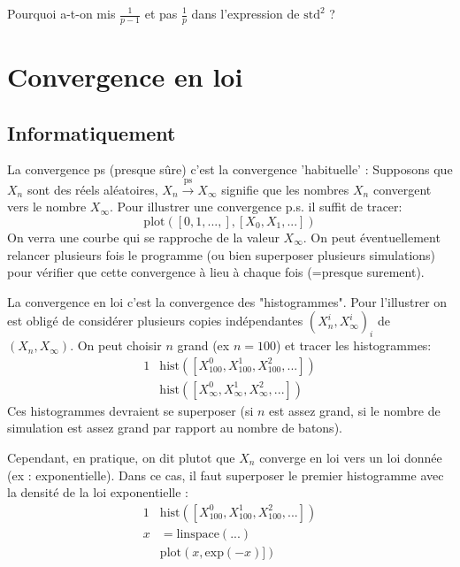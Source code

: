 \documentclass{article}
\def\std{\text{std}}
\begin{document}
\begin{exo} Pourquoi a-t-on mis $\frac 1 {p-1}$ et pas $\frac 1 p $ dans l'expression de $\std^2$ ?    
\end{exo}








 



\section{Convergence en loi}


\subsection{Informatiquement}

La convergence ps (presque sûre) c'est la convergence 'habituelle' :     Supposons que $X_n$ sont des réels aléatoires,   $X_n   \xrightarrow{\text{ps}} X_\infty$ signifie que les nombres $X_n$ convergent vers le nombre $X_\infty$.   Pour illustrer une convergence p.s. il suffit de tracer: 
$$
\mathrm{plot}( [0,1,...,], [X_0,X_1,...])   
$$
 On verra une courbe qui se rapproche de la valeur $X_\infty$.  On peut éventuellement relancer plusieurs fois le programme (ou bien superposer plusieurs simulations) pour vérifier que cette convergence à lieu à chaque fois (=presque surement). 


La convergence en loi c'est la convergence des "histogrammes". Pour l'illustrer on est obligé de considérer plusieurs copies indépendantes  $(X^i_n,X^i_\infty)_i$ de $(X_n,X_\infty)$.  On peut choisir $n$ grand (ex $n=100$)    et tracer les histogrammes:
\begin{alignat}{1}
&\mathrm{hist}(  [X^0_{100}, X^1_{100},X^2_{100},...]) \\
&\mathrm{hist}(  [X^0_{\infty}, X^1_{\infty},X^2_{\infty},...])
\end{alignat}
Ces histogrammes devraient se superposer (si $n$ est assez grand, si le nombre de simulation est assez grand par rapport au nombre de batons).

Cependant, en pratique, on dit plutot que $X_n$ converge en loi vers un loi donnée (ex : exponentielle). Dans ce cas, il faut superposer le premier histogramme avec la densité de la loi exponentielle : 
\begin{alignat}{1}
&\mathrm{hist}(  [X^0_{100}, X^1_{100},X^2_{100},...]) \\
x&=\mathrm{linspace(...)}\\
&\mathrm{plot}(  x,  \mathrm{exp}(-x) ])
\end{alignat}
\end{document}
